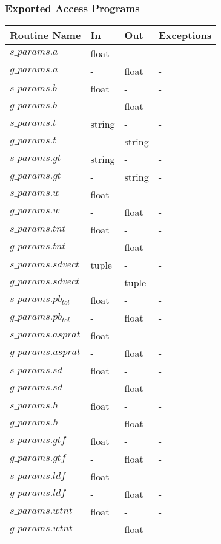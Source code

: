 \documentclass[12pt]{article}
\begin{document}
\subsubsection{Exported Access Programs} \label{SecEAPparams}

\begin{center} \noindent
\begin{tabular}{l l l l}
\hline \textbf{Routine Name} & \textbf{In} & \textbf{Out} & \textbf{Exceptions} \\ \hline 
$s\_params.a$&float&-&- \\ \hline
$g\_params.a$&-&float&- \\ \hline
$s\_params.b$&float&-&- \\ \hline
$g\_params.b$&-&float&- \\ \hline
$s\_params.t$&string&-&- \\ \hline
$g\_params.t$&-&string&- \\ \hline
$s\_params.gt$&string&-&- \\ \hline
$g\_params.gt$&-&string&- \\ \hline
$s\_params.w$&float&-&- \\ \hline
$g\_params.w$&-&float&- \\ \hline
$s\_params.tnt$&float&-&- \\ \hline
$g\_params.tnt$&-&float&-\\ \hline
$s\_params.sdvect$&tuple&-&- \\ \hline
$g\_params.sdvect$&-&tuple&- \\ \hline
$s\_params.pb_{tol}$&float&-&- \\ \hline
$g\_params.pb_{tol}$&-&float&- \\ \hline
$s\_params.asprat$&float&-&- \\ \hline
$g\_params.asprat$&-&float&- \\ \hline
$s\_params.sd$&float&-&- \\ \hline
$g\_params.sd$&-&float&- \\ \hline
$s\_params.h$&float&-&- \\ \hline
$g\_params.h$&-&float&- \\ \hline
$s\_params.gtf$&float&-&- \\ \hline
$g\_params.gtf$&-&float&- \\ \hline
$s\_params.ldf$&float&-&- \\ \hline
$g\_params.ldf$&-&float&- \\ \hline
$s\_params.wtnt$&float&-&- \\ \hline
$g\_params.wtnt$&-&float&- \\ \hline

\end{tabular}
\end{center}
\end{document}
